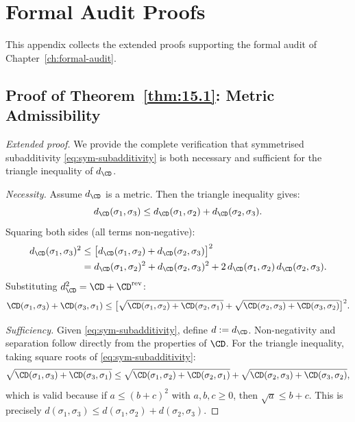 
\chapter{Formal Audit Proofs}
\label{app:formal-audit-proofs}

This appendix collects the extended proofs supporting the formal
audit of Chapter~\ref{ch:formal-audit}.

\section{Proof of Theorem~\ref{thm:15.1}: Metric Admissibility}
\label{app:pf-metric-admissibility}

\begin{proof}[Extended proof]
We provide the complete verification that symmetrised subadditivity
\eqref{eq:sym-subadditivity} is both necessary and sufficient for the
triangle inequality of $d_{\CD}$.

\emph{Necessity.}  Assume $d_{\CD}$ is a metric.  Then the triangle
inequality gives:
\[
  d_{\CD}(\sigma_1, \sigma_3)
  \leq d_{\CD}(\sigma_1, \sigma_2) + d_{\CD}(\sigma_2, \sigma_3).
\]
Squaring both sides (all terms non-negative):
\begin{align*}
  d_{\CD}(\sigma_1, \sigma_3)^2
  &\leq \big[d_{\CD}(\sigma_1, \sigma_2) + d_{\CD}(\sigma_2, \sigma_3)\big]^2 \\
  &= d_{\CD}(\sigma_1, \sigma_2)^2 + d_{\CD}(\sigma_2, \sigma_3)^2
  + 2\,d_{\CD}(\sigma_1, \sigma_2)\,d_{\CD}(\sigma_2, \sigma_3).
\end{align*}
Substituting $d_{\CD}^2 = \CD + \CD^{\mathrm{rev}}$:
\[
  \CD(\sigma_1, \sigma_3) + \CD(\sigma_3, \sigma_1)
  \leq \big[\sqrt{\CD(\sigma_1, \sigma_2) + \CD(\sigma_2, \sigma_1)}
  + \sqrt{\CD(\sigma_2, \sigma_3) + \CD(\sigma_3, \sigma_2)}\big]^2.
\]

\emph{Sufficiency.}  Given \eqref{eq:sym-subadditivity}, define
$d := d_{\CD}$.  Non-negativity and separation follow directly from the
properties of $\CD$.  For the triangle inequality, taking square roots
of \eqref{eq:sym-subadditivity}:
\[
  \sqrt{\CD(\sigma_1, \sigma_3) + \CD(\sigma_3, \sigma_1)}
  \leq \sqrt{\CD(\sigma_1, \sigma_2) + \CD(\sigma_2, \sigma_1)}
  + \sqrt{\CD(\sigma_2, \sigma_3) + \CD(\sigma_3, \sigma_2)},
\]
which is valid because if $a \leq (b + c)^2$ with $a, b, c \geq 0$,
then $\sqrt{a} \leq b + c$.  This is precisely
$d(\sigma_1, \sigma_3) \leq d(\sigma_1, \sigma_2) + d(\sigma_2, \sigma_3)$.
\end{proof}

